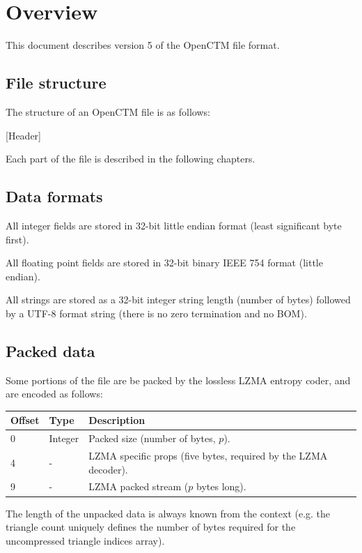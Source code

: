 \tableofcontents



\chapter{Overview}
This document describes version 5 of the OpenCTM file format.

\section{File structure}
The structure of an OpenCTM file is as follows:

[Header]

Each part of the file is described in the following chapters.

\section{Data formats}
All integer fields are stored in 32-bit little endian format (least significant
byte first).

All floating point fields are stored in 32-bit binary IEEE 754 format (little
endian).

All strings are stored as a 32-bit integer string length (number of bytes)
followed by a UTF-8 format string (there is no zero termination and no BOM).

\section{Packed data}
\label{tab:PackedData}
Some portions of the file are be packed by the lossless LZMA entropy coder,
and are encoded as follows:

\begin{tabular}{|l|l|l|}\hline
\textbf{Offset} & \textbf{Type} & \textbf{Description}\\ \hline
0 & Integer & Packed size (number of bytes, $p$).\\ \hline
4 & - & LZMA specific props (five bytes, required by the LZMA decoder).\\ \hline
9 & - & LZMA packed stream ($p$ bytes long).\\ \hline
\end{tabular}

The length of the unpacked data is always known from the context (e.g. the
triangle count uniquely defines the number of bytes required for the
uncompressed triangle indices array).

